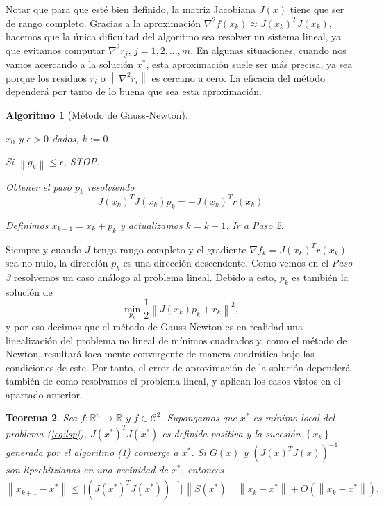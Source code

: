 \documentclass[11pt,a4paper]{book}
\newtheorem{theorem}{Teorema}[chapter]
\newtheorem{algorithm}[theorem]{Algoritmo}
\theoremstyle{definition}
\theoremstyle{remark}
\newcommand{\norm}[1]{\left\lVert#1\right\rVert}
\newcommand{\sucesionxk}{\left\{x_k\right\}}
\begin{document}
Notar que para que esté bien definido, la matriz Jacobiana $J(x)$ tiene que ser de rango completo. Gracias a la aproximación $\nabla^2 f(x_k) \approx J(x_k)^TJ(x_k)$, hacemos que la única dificultad del algoritmo sea resolver un sistema lineal, ya que evitamos computar $\nabla^2 r_j,\,j=1,2,\ldots ,m$. En algunas situaciones, cuando nos vamos acercando a la solución $x^*$, esta aproximación suele ser más precisa, ya sea porque los residuos $r_i$ o $\norm{\nabla^2 r_i}$ es cercano a cero. La eficacia del método dependerá por tanto de lo buena que sea esta aproximación.

\begin{algorithm}[Método de Gauss-Newton] \leavevmode
\label{al:g-n}
\begin{steps}
	\item $x_0$ y $\epsilon > 0$ dados, $k:=0$
	\item Si $\norm{g_k} \leq \epsilon$, STOP.   
	\item Obtener el paso $p_k$ resolviendo
		\begin{equation}
			J(x_k)^TJ(x_k)p_k = -J(x_k)^Tr(x_k)
		\end{equation}
	\item Definimos $x_{k+1} = x_k + p_k$ y actualizamos $k=k+1$. Ir a Paso 2. \quad \qedsymbol
\end{steps}
\end{algorithm}

Siempre y cuando $J$ tenga rango completo y el gradiente $\nabla f_k = J(x_k)^Tr(x_k)$ sea no nulo, la dirección $p_k$ es una dirección descendente.
Como vemos en el \textit{Paso 3} resolvemos un caso análogo al problema lineal. Debido a esto, $p_k$ es también la solución de
\begin{equation}
	\min_{p_k} \frac{1}{2} \norm{J(x_k)p_k + r_k}^2,
\end{equation}
y por eso decimos que el método de Gauss-Newton es en realidad una linealización del problema no lineal de mínimos cuadrados y, como el método de Newton, resultará localmente convergente de manera cuadrática bajo las condiciones de este.
Por tanto, el error de aproximación de la solución dependerá también de como resolvamos el problema lineal, y aplican los casos vistos en el apartado anterior.

\begin{theorem}
	\label{th:gn1}
	Sea $f: \mathbb{R}^n \rightarrow \mathbb{R}$ y $f \in \mathcal{C}^2$. Supongamos que $x^*$ es mínimo local del problema (\ref{eq:lsp}), $J(x^*)^TJ(x^*)$ es definida positiva y la sucesión $\sucesionxk$ generada por el algoritmo (\ref{al:g-n}) converge a $x^*$. Si $G(x)$ y $(J(x)^TJ(x))^{-1}$ son lipschitzianas en una vecinidad de $x^*$, entonces
\begin{equation}
	\norm{x_{k+1}-x^*} \leq \Vert (J(x^*)^TJ(x^*))^{-1} \Vert \norm{S(x^*)} \norm{x_k-x^*}
	+ O(\norm{x_k-x^*}).
\end{equation}
\end{theorem}
\end{document}
